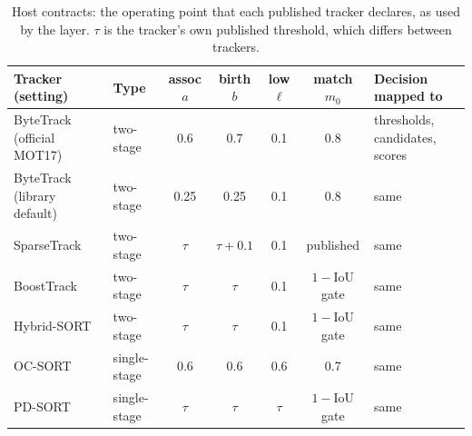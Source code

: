 \begin{table}[t]
\caption{Host contracts: the operating point that each published tracker
declares, as used by the layer. $\tau$ is the tracker's own published
threshold, which differs between trackers.}
\label{tab:contracts}
\centering\footnotesize
\setlength{\tabcolsep}{4pt}
\begin{tabular}{@{}>{\raggedright\arraybackslash}p{30mm}lcccc>{\raggedright\arraybackslash}p{32mm}@{}}
\toprule
Tracker (setting) & Type & assoc $a$ & birth $b$ & low $\ell$ & match $m_0$ & Decision mapped to\\
\midrule
ByteTrack (official MOT17) & two-stage & 0.6 & 0.7 & 0.1 & 0.8 & thresholds, candidates, scores\\
ByteTrack (library default) & two-stage & 0.25 & 0.25 & 0.1 & 0.8 & same\\
SparseTrack & two-stage & $\tau$ & $\tau+0.1$ & 0.1 & published & same\\
BoostTrack & two-stage & $\tau$ & $\tau$ & 0.1 & $1-$IoU gate & same\\
Hybrid-SORT & two-stage & $\tau$ & $\tau$ & 0.1 & $1-$IoU gate & same\\
OC-SORT & single-stage & 0.6 & 0.6 & 0.6 & 0.7 & same\\
PD-SORT & single-stage & $\tau$ & $\tau$ & $\tau$ & $1-$IoU gate & same\\
\bottomrule
\end{tabular}
\end{table}
